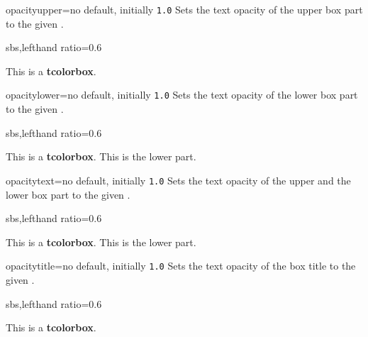 \clearpage
\begin{docTcbKey}{opacityupper}{=}{no default, initially \texttt{1.0}}
  Sets the text opacity of the upper box part to the given .
\begin{dispExample*}{sbs,lefthand ratio=0.6}
\begin{tcolorbox}[enhanced,opacityupper=0.5,
  interior style={pattern=crosshatch dots light steel blue}]
This is a \textbf{tcolorbox}.
\end{tcolorbox}
\end{dispExample*}
\end{docTcbKey}


\begin{docTcbKey}{opacitylower}{=}{no default, initially \texttt{1.0}}
  Sets the text opacity of the lower box part to the given .
\begin{dispExample*}{sbs,lefthand ratio=0.6}
\begin{tcolorbox}[enhanced,opacitylower=0.5,
  interior style={pattern=crosshatch dots light steel blue}]
This is a \textbf{tcolorbox}.
\tcblower
This is the lower part.
\end{tcolorbox}
\end{dispExample*}
\end{docTcbKey}

\begin{docTcbKey}{opacitytext}{=}{no default, initially \texttt{1.0}}
  Sets the text opacity of the upper and the lower box part to the given .
\begin{dispExample*}{sbs,lefthand ratio=0.6}
\begin{tcolorbox}[enhanced,opacitytext=0.5,
  interior style={pattern=crosshatch dots light steel blue}]
This is a \textbf{tcolorbox}.
\tcblower
This is the lower part.
\end{tcolorbox}
\end{dispExample*}
\end{docTcbKey}


\begin{docTcbKey}{opacitytitle}{=}{no default, initially \texttt{1.0}}
  Sets the text opacity of the box title to the given .
\begin{dispExample*}{sbs,lefthand ratio=0.6}
\begin{tcolorbox}[enhanced,opacitytitle=0.7,
  fonttitle=\bfseries,title=This is a title,
  title style={pattern=crosshatch dots light steel blue}]
This is a \textbf{tcolorbox}.
\end{tcolorbox}
\end{dispExample*}
\end{docTcbKey}


